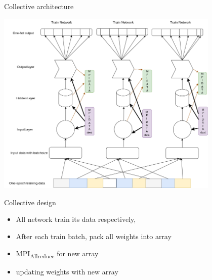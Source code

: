 \documentclass[presentation]{beamer}
\begin{document}
\begin{frame}[label={sec:orgf132af2}]{Collective architecture}
\begin{center}
\includegraphics[width=0.8\textwidth]{./png/MPINetworkAllreduce.png}
\end{center}
\end{frame}
\begin{frame}[label={sec:orgb162896}]{Collective design}
\begin{itemize}
\item All network train its data respectively,
\item After each train batch, pack all weights into array
\item MPI\textsubscript{Allreduce} for new array
\item updating weights with  new array
\end{itemize}
\end{frame}
\end{document}
